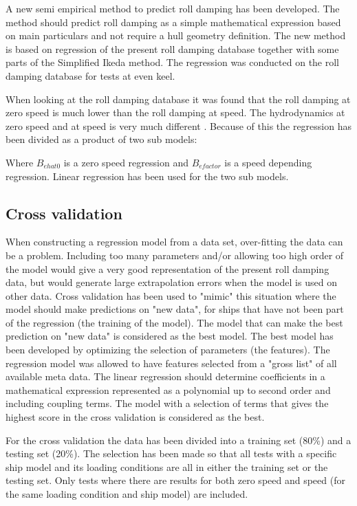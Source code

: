 A new semi empirical method to predict roll damping has been developed. The method should predict roll damping as a simple mathematical expression based on main particulars and not require a hull geometry definition. The new method is based on regression of the present roll damping database together with some parts of the Simplified Ikeda method.  The regression was conducted on the roll damping database for tests at even keel.

When looking at the roll damping database it was found that the roll damping at zero speed is much lower than the roll damping at speed. The hydrodynamics at zero speed and at speed is very much different \parencite{ikeda_velocity_1979}. Because of this the regression has been divided as a product of two sub models:

Where $B_{ehat0}$ is a zero speed regression and $B_{efactor}$ is a speed depending regression. Linear regression has been used for the two sub models. 

\subsection{Cross validation}
When constructing a regression model from a data set, over-fitting the data can be a problem. Including too many parameters and/or allowing too high order of the model would give a very good representation of the present roll damping data, but would generate large extrapolation errors when the model is used on other data. Cross validation has been used to "mimic" this situation where the model should make predictions on "new data", for ships that have not been part of the regression (the training of the model). The model that can make the best prediction on "new data" is considered as the best model. The best model has been developed by optimizing the selection of parameters (the features). The regression model was allowed to have features selected from a "gross list" of all available meta data. The linear regression should determine coefficients in a mathematical expression represented as a polynomial up to second order and including coupling terms. The model with a selection of terms that gives the highest score in the cross validation is considered as the best.    

For the cross validation the data has been divided into a  training set (80\%) and a testing set (20\%). The selection has been made so that all tests with a specific ship model and its loading conditions are all in either the training set or the testing set. Only tests where there are results for both zero speed and speed (for the same loading condition and ship model) are included.


